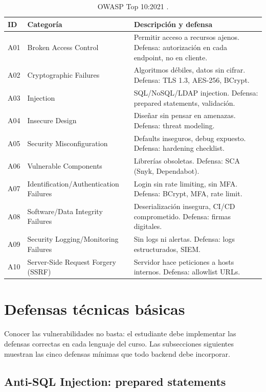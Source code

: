 \documentclass[11pt,a4paper,openany]{book}
\begin{document}
\begin{table}[htbp]
\centering
\caption{OWASP Top 10:2021 \cite{owasp2021top10}.}
\footnotesize
\begin{tabularx}{\textwidth}{llX}
\toprule
\textbf{ID} & \textbf{Categoría} & \textbf{Descripción y defensa}\\
\midrule
A01 & Broken Access Control & Permitir acceso a recursos ajenos. Defensa: autorización en cada endpoint, no en cliente.\\
A02 & Cryptographic Failures & Algoritmos débiles, datos sin cifrar. Defensa: TLS 1.3, AES-256, BCrypt.\\
A03 & Injection & SQL/NoSQL/LDAP injection. Defensa: prepared statements, validación.\\
A04 & Insecure Design & Diseñar sin pensar en amenazas. Defensa: threat modeling.\\
A05 & Security Misconfiguration & Defaults inseguros, debug expuesto. Defensa: hardening checklist.\\
A06 & Vulnerable Components & Librerías obsoletas. Defensa: SCA (Snyk, Dependabot).\\
A07 & Identification/Authentication Failures & Login sin rate limiting, sin MFA. Defensa: BCrypt, MFA, rate limit.\\
A08 & Software/Data Integrity Failures & Deserialización insegura, CI/CD comprometido. Defensa: firmas digitales.\\
A09 & Security Logging/Monitoring Failures & Sin logs ni alertas. Defensa: logs estructurados, SIEM.\\
A10 & Server-Side Request Forgery (SSRF) & Servidor hace peticiones a hosts internos. Defensa: allowlist URLs.\\
\bottomrule
\end{tabularx}
\end{table}

\section{Defensas técnicas básicas}

Conocer las vulnerabilidades no basta: el estudiante debe
implementar las defensas correctas en cada lenguaje del curso. Las
subsecciones siguientes muestran las cinco defensas mínimas que
todo backend debe incorporar.


\subsection{Anti-SQL Injection: prepared statements}
\end{document}
